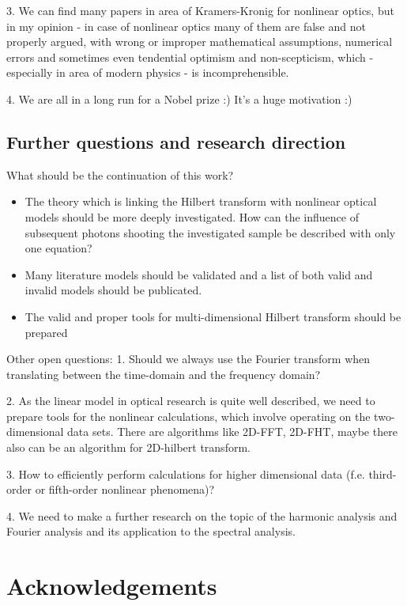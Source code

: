 \documentclass[12pt,twoside,a4paper]{article}
\numberwithin{equation}{subsection}
\numberwithin{figure}{subsection}
\begin{document}
3. We can find many papers in area of Kramers-Kronig for nonlinear optics, but in my opinion - in case of nonlinear optics many of them are false and not properly argued, with wrong or improper mathematical assumptions, numerical errors and sometimes even tendential optimism and non-scepticism, which - especially in area of modern physics - is incomprehensible.

4. We are all in a long run for a Nobel prize :) It's a huge motivation :)

\subsection{Further questions and research direction} \label{chap:conclusion_further}

What should be the continuation of this work?

\begin{itemize} 
	\item The theory which is linking the Hilbert transform with nonlinear optical models should be more deeply investigated. How can the influence of subsequent photons shooting the investigated sample be described with only one equation?
	\item Many literature models should be validated and a list of both valid and invalid models should be publicated.
	\item The valid and proper tools for multi-dimensional Hilbert transform should be prepared
\end{itemize}


Other open questions:
1. Should we always use the Fourier transform when translating between the time-domain and the frequency domain?

2. As the linear model in optical research is quite well described, we need to prepare tools for the nonlinear calculations, which involve operating on the two-dimensional data sets. There are algorithms like 2D-FFT, 2D-FHT, maybe there also can be an algorithm for 2D-hilbert transform.

3. How to efficiently perform calculations for higher dimensional data (f.e. third-order or fifth-order nonlinear phenomena)?

4. We need to make a further research on the topic of the harmonic analysis and Fourier analysis and its application to the spectral analysis.

\section{Acknowledgements} \label{chap:acknowledgements}
\end{document}
